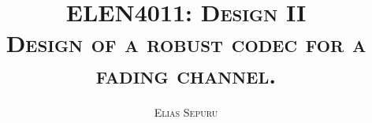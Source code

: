 \documentclass[11pt]{report}
\title{
	\textsc{ELEN4011: Design II}
	\HRule \\[0.4cm] %
	\textsc{
		Design of a robust codec for a fading channel.}
	\HRule \\[1.5cm] %
}
\author{\textsc{Elias Sepuru}}
\begin{document}
		\maketitle
\begin{abstract}
\end{abstract}
\end{document}
